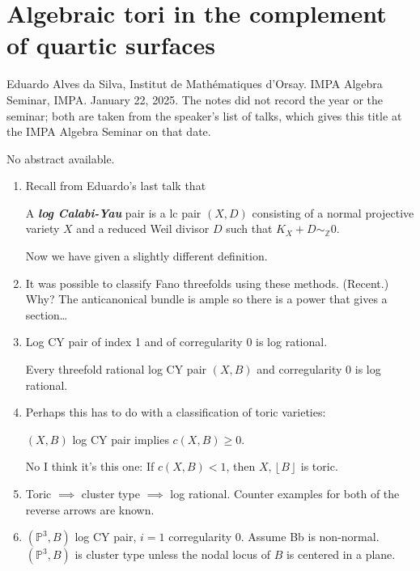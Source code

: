 \section{Algebraic tori in the complement of
quartic surfaces}
\label{section-alves-algebraic-tori-quartic}

\noindent
Eduardo Alves da Silva, Institut de
Math\'ematiques d'Orsay.
IMPA Algebra Seminar, IMPA.
January 22, 2025. The notes did not record
the year or the seminar; both are taken from
the speaker's list of talks, which gives this
title at the IMPA Algebra Seminar on that
date.

\medskip\noindent
No abstract available.

\begin{enumerate}
\item Recall from Eduardo's last talk that

\begin{definition}
\label{definition-alves-tori-1}
A \textit{\textbf{log Calabi-Yau}} pair is a
lc pair  $(X,D)$ consisting of a normal
projective variety $X$ and a reduced Weil
divisor $D$ such that
$K_X+D\sim_{\mathbb{Z}}0$.
\end{definition}

Now we have given a slightly different
definition.

\item  It was possible to classify Fano
threefolds using these methods. (Recent.)
Why? The anticanonical bundle is ample so
there is a power that gives a section\ldots{}
\item
\begin{theorem}
\label{theorem-alves-tori-1}
Log CY pair of index 1 and of corregularity 0
is log rational.
\end{theorem}
\medskip{}
Every threefold rational log CY pair $(X,B )$
and corregularity 0 is log rational.

\item  Perhaps this has to do with a
classification of toric varieties:
\begin{theorem}
\label{theorem-alves-tori-2}
$(X,B)$ log CY pair implies $c (X,B ) \geq
0$.
\end{theorem}
No I think it's this one:
\medskip{}
If $c(X,B)<1$, then $X,\left\lfloor B
\right\rfloor$ is toric.

\item Toric $\implies $ cluster type
$\implies $ log rational. Counter examples
for both of the reverse arrows are known.
\item
\begin{theorem}
\label{theorem-alves-tori-3}
$(\mathbb{P}^3,B)$ log CY pair, $i=1$
corregularity 0. Assume Bb is non-normal.
$(\mathbb{P}^3, B )$ is cluster type unless
the nodal locus of  $B$ is centered in a
plane.
\end{theorem}
\end{enumerate}

